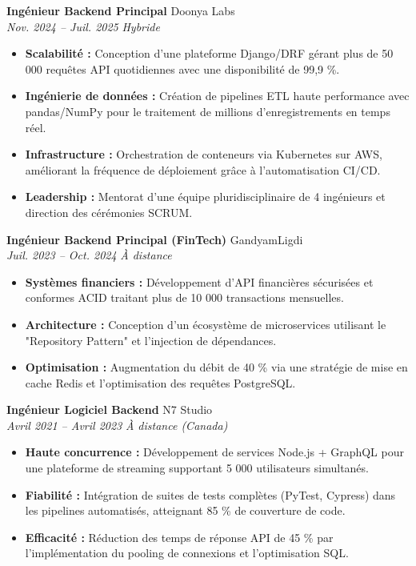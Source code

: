 \documentclass[a4paper,10pt]{article}
\newcommand{\jobheader}[4]{%
    \textbf{#1} \hfill #2 \\
    \textit{#3} \hfill \textit{#4}
    \vspace{0.05cm}
}
\begin{document}
\jobheader{Ingénieur Backend Principal}{Doonya Labs}{Nov. 2024 -- Juil. 2025}{Hybride}
\begin{itemize}[leftmargin=*,nosep]
    \item \textbf{Scalabilité :} Conception d'une plateforme Django/DRF gérant plus de 50 000 requêtes API quotidiennes avec une disponibilité de 99,9 \%.
    \item \textbf{Ingénierie de données :} Création de pipelines ETL haute performance avec pandas/NumPy pour le traitement de millions d'enregistrements en temps réel.
    \item \textbf{Infrastructure :} Orchestration de conteneurs via Kubernetes sur AWS, améliorant la fréquence de déploiement grâce à l'automatisation CI/CD.
    \item \textbf{Leadership :} Mentorat d'une équipe pluridisciplinaire de 4 ingénieurs et direction des cérémonies SCRUM.
\end{itemize}

\vspace{0.15cm}

\jobheader{Ingénieur Backend Principal (FinTech)}{GandyamLigdi}{Juil. 2023 -- Oct. 2024}{À distance}
\begin{itemize}[leftmargin=*,nosep]
    \item \textbf{Systèmes financiers :} Développement d'API financières sécurisées et conformes ACID traitant plus de 10 000 transactions mensuelles.
    \item \textbf{Architecture :} Conception d'un écosystème de microservices utilisant le "Repository Pattern" et l'injection de dépendances.
    \item \textbf{Optimisation :} Augmentation du débit de 40 \% via une stratégie de mise en cache Redis et l'optimisation des requêtes PostgreSQL.
\end{itemize}

\vspace{0.15cm}

\jobheader{Ingénieur Logiciel Backend}{N7 Studio}{Avril 2021 -- Avril 2023}{À distance (Canada)}
\begin{itemize}[leftmargin=*,nosep]
    \item \textbf{Haute concurrence :} Développement de services Node.js + GraphQL pour une plateforme de streaming supportant 5 000 utilisateurs simultanés.
    \item \textbf{Fiabilité :} Intégration de suites de tests complètes (PyTest, Cypress) dans les pipelines automatisés, atteignant 85 \% de couverture de code.
    \item \textbf{Efficacité :} Réduction des temps de réponse API de 45 \% par l'implémentation du pooling de connexions et l'optimisation SQL.
\end{itemize}
\end{document}
